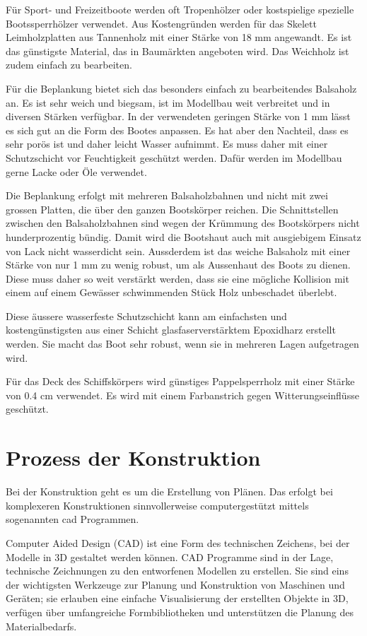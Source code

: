 Für Sport- und Freizeitboote werden oft Tropenhölzer oder kostspielige spezielle Bootssperrhölzer verwendet. Aus Kostengründen werden für das Skelett Leimholzplatten aus Tannenholz mit einer Stärke von 18 mm angewandt. Es ist das günstigste Material, das in Baumärkten angeboten wird. Das Weichholz ist zudem einfach zu bearbeiten.

Für die Beplankung bietet sich das besonders einfach zu bearbeitendes Balsaholz an. Es ist sehr weich und biegsam, ist im Modellbau weit verbreitet und in diversen Stärken verfügbar. In der verwendeten geringen Stärke von 1 mm lässt es sich gut an die Form des Bootes anpassen. Es hat aber den Nachteil, dass es sehr porös ist und daher leicht Wasser aufnimmt. Es muss daher mit einer Schutzschicht vor Feuchtigkeit geschützt werden. Dafür werden im Modellbau gerne Lacke oder Öle verwendet.

Die Beplankung erfolgt mit mehreren Balsaholzbahnen und nicht mit zwei grossen Platten, die über den ganzen Bootskörper reichen. Die Schnittstellen zwischen den Balsaholzbahnen sind wegen der Krümmung des Bootskörpers nicht hunderprozentig bündig. Damit wird die Bootshaut auch mit ausgiebigem Einsatz von Lack nicht wasserdicht sein. Aussderdem ist das weiche Balsaholz mit einer Stärke von nur 1 mm zu wenig robust, um als Aussenhaut des Boots zu dienen. Diese muss daher so weit verstärkt werden, dass sie eine mögliche Kollision mit einem auf einem Gewässer schwimmenden Stück Holz unbeschadet überlebt.

Diese äussere wasserfeste Schutzschicht kann am einfachsten und kostengünstigsten aus einer Schicht glasfaserverstärktem Epoxidharz erstellt werden. Sie macht das Boot sehr robust, wenn sie in mehreren Lagen aufgetragen wird.

Für das Deck des Schiffskörpers wird günstiges Pappelsperrholz mit einer Stärke von 0.4 cm verwendet. Es wird mit einem Farbanstrich gegen Witterungseinflüsse geschützt.  

\section{Prozess der Konstruktion}
Bei der Konstruktion geht es um die Erstellung von Plänen. Das erfolgt bei komplexeren Konstruktionen sinnvollerweise computergestützt mittels sogenannten \ac{cad} Programmen. 

Computer Aided Design (CAD) ist eine Form des technischen Zeichens, bei der Modelle in 3D gestaltet werden können. CAD Programme sind in der Lage, technische Zeichnungen zu den entworfenen Modellen zu erstellen. Sie sind eins der wichtigsten Werkzeuge zur Planung und Konstruktion von Maschinen und Geräten; sie erlauben eine einfache Visualisierung der erstellten Objekte in 3D, verfügen über umfangreiche Formbibliotheken und unterstützen die Planung des Materialbedarfs.

